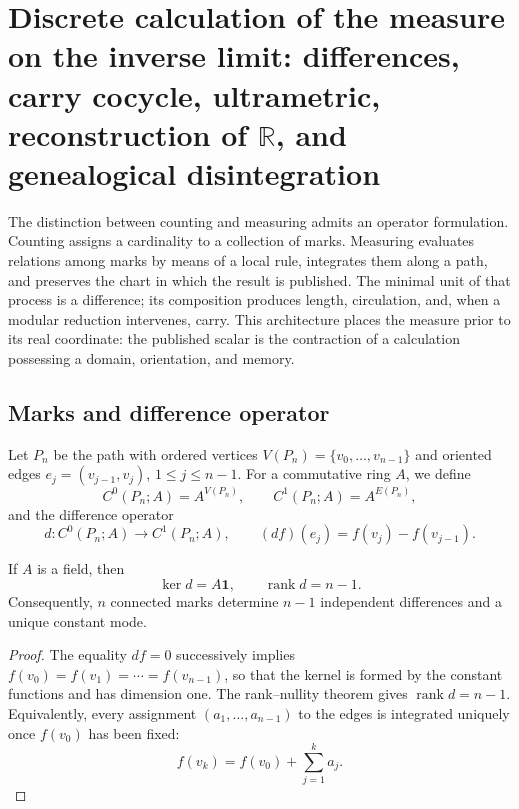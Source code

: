 \section{Discrete calculation of the measure on the inverse limit: differences, carry cocycle, ultrametric, reconstruction of \texorpdfstring{\(\mathbb R\)}{R}, and genealogical disintegration}
\label{sec:complejo-discreto-medida-rev2}

The distinction between counting and measuring admits an operator formulation. Counting assigns a cardinality to a collection of marks. Measuring evaluates relations among marks by means of a local rule, integrates them along a path, and preserves the chart in which the result is published. The minimal unit of that process is a difference; its composition produces length, circulation, and, when a modular reduction intervenes, carry. This architecture places the measure prior to its real coordinate: the published scalar is the contraction of a calculation possessing a domain, orientation, and memory.

\subsection{Marks and difference operator}

Let \(P_n\) be the path with ordered vertices
\(V(P_n)=\{v_0,\ldots,v_{n-1}\}\) and oriented edges
\(e_j=(v_{j-1},v_j)\), \(1\leq j\leq n-1\). For a commutative ring
\(A\), we define
\[
 C^0(P_n;A)=A^{V(P_n)},
 \qquad
 C^1(P_n;A)=A^{E(P_n)},
\]
and the difference operator
\begin{equation}
 d:C^0(P_n;A)\longrightarrow C^1(P_n;A),
 \qquad
 (df)(e_j)=f(v_j)-f(v_{j-1}).
 \label{eq:diferencia-cero-uno-rev2}
\end{equation}

\begin{theorem}
\label{thm:rango-diferencias-camino-rev2}
If \(A\) is a field, then
\[
 \ker d=A\mathbf 1,
 \qquad
 \operatorname{rank}d=n-1.
\]
Consequently, \(n\) connected marks determine \(n-1\)
independent differences and a unique constant mode.
\end{theorem}

\begin{proof}
The equality \(df=0\) successively implies
\(f(v_0)=f(v_1)=\cdots=f(v_{n-1})\), so that the kernel is formed by
the constant functions and has dimension one. The rank--nullity theorem
gives \(\operatorname{rank}d=n-1\). Equivalently, every
assignment \((a_1,\ldots,a_{n-1})\) to the edges is integrated uniquely
once \(f(v_0)\) has been fixed:
\[
 f(v_k)=f(v_0)+\sum_{j=1}^{k}a_j.
\]
\end{proof}


